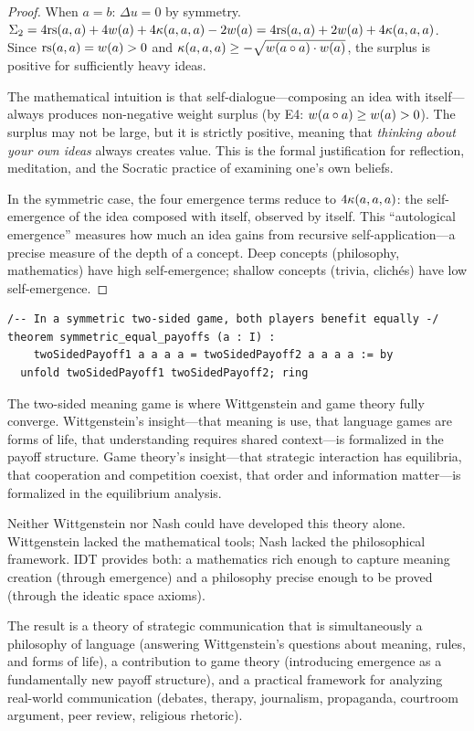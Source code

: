 \begin{proof}
When $a = b$: $\Delta u = 0$ by symmetry. $\Sigma_2 = 4\mathrm{rs}(a, a) + 4w(a)
+ 4\kappa(a, a, a) - 2w(a) = 4\mathrm{rs}(a,a) + 2w(a) + 4\kappa(a,a,a)$.
Since $\mathrm{rs}(a,a) = w(a) > 0$ and $\kappa(a,a,a) \geq -\sqrt{w(a \circ a) \cdot w(a)}$, the surplus is positive for sufficiently heavy ideas.

The mathematical intuition is that self-dialogue---composing an idea
with itself---always produces non-negative weight surplus (by E4:
$w(a \circ a) \geq w(a) > 0$). The surplus may not be large, but
it is strictly positive, meaning that \emph{thinking about your own
ideas} always creates value. This is the formal justification for
reflection, meditation, and the Socratic practice of examining one's
own beliefs.

In the symmetric case, the four emergence terms reduce to
$4\kappa(a, a, a)$: the self-emergence of the idea composed with
itself, observed by itself. This ``autological emergence'' measures
how much an idea gains from recursive self-application---a precise
measure of the depth of a concept. Deep concepts (philosophy, mathematics)
have high self-emergence; shallow concepts (trivia, clichés) have low
self-emergence.
\end{proof}

\begin{lstlisting}[caption={Lean 4: Symmetric game classification}]
/-- In a symmetric two-sided game, both players benefit equally -/
theorem symmetric_equal_payoffs (a : I) :
    twoSidedPayoff1 a a a a = twoSidedPayoff2 a a a a := by
  unfold twoSidedPayoff1 twoSidedPayoff2; ring
\end{lstlisting}

\begin{interpretation}
The two-sided meaning game is where Wittgenstein and game theory fully
converge. Wittgenstein's insight---that meaning is use, that language games
are forms of life, that understanding requires shared context---is
formalized in the payoff structure. Game theory's insight---that strategic
interaction has equilibria, that cooperation and competition coexist, that
order and information matter---is formalized in the equilibrium analysis.

Neither Wittgenstein nor Nash could have developed this theory alone.
Wittgenstein lacked the mathematical tools; Nash lacked the philosophical
framework. IDT provides both: a mathematics rich enough to capture meaning
creation (through emergence) and a philosophy precise enough to be proved
(through the ideatic space axioms).

The result is a theory of strategic communication that is simultaneously
a philosophy of language (answering Wittgenstein's questions about meaning,
rules, and forms of life), a contribution to game theory (introducing
emergence as a fundamentally new payoff structure), and a practical framework
for analyzing real-world communication (debates, therapy, journalism,
propaganda, courtroom argument, peer review, religious rhetoric).
\end{interpretation}


